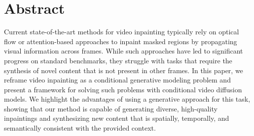 \chapter{Abstract}
Current state-of-the-art methods for video inpainting typically rely on optical flow or attention-based approaches to inpaint masked regions by propagating visual information across frames. While such approaches have led to significant progress on standard benchmarks, they struggle with tasks that require the synthesis of novel content that is not present in other frames. In this paper, we reframe video inpainting as a conditional generative modeling problem and present a framework for solving such problems with conditional video diffusion models. We highlight the advantages of using a generative approach for this task, showing that our method is capable of generating diverse, high-quality inpaintings and synthesizing new content that is spatially, temporally, and semantically consistent with the provided context.